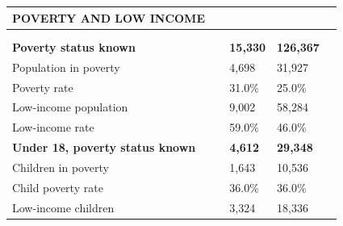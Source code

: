 \documentclass[9pt]{report}
\begin{document}
\vspace{12pt}
\setlength{\tabcolsep}{.01in} %
\begin{tabular}{p{.10in}p{.10in}p{.10in}p{3.7in}>{\hfill}p{.85in}>{\hfill}p{.85in}>{\hfill}p{.85in}>{\hfill}p{.85in}p{0.1in}}
\multicolumn{9}{l}{\parbox{7.1in}{\raggedright{\large{\strut\textbf{POVERTY AND LOW INCOME}\strut}}}} \\ 
\hline
\multicolumn{4}{l}{\parbox{3.5in}{\raggedright{\textbf{}}}} & \multicolumn{1}{r}{\parbox{.85in}{\strut\raggedleft{\textbf{}\strut}}} & \multicolumn{1}{r}{\parbox{.85in}{\strut\raggedleft{\textbf{}\strut}}} & \multicolumn{1}{r}{\parbox{.85in}{\strut{}}} & \multicolumn{1}{r}{\parbox{.85in}{\strut{}}} & \\ 
\multicolumn{9}{l}{} \\ 
\multicolumn{4}{l}{\parbox{3.5in}{\strut\raggedright{\textbf{Poverty status known}\strut}}} & \textbf{} & \textbf{} & \textbf{15,330} & \textbf{126,367} & \textbf{} \\ 
\multicolumn{4}{l}{\parbox{3.6in}{\strut\raggedright{{Population in poverty}}\strut}} &  &  & 4,698 & 31,927 & \multicolumn{1}{l}{}  \\ 
\multicolumn{4}{l}{\parbox{3.6in}{\strut\raggedright{{Poverty rate}}\strut}} &  &  & 31.0\% & 25.0\% & \multicolumn{1}{l}{}  \\ 
\multicolumn{4}{l}{\parbox{3.6in}{\strut\raggedright{{Low-income population}}\strut}} &  &  & 9,002 & 58,284 & \multicolumn{1}{l}{}  \\ 
\multicolumn{4}{l}{\parbox{3.6in}{\strut\raggedright{{Low-income rate}}\strut}} &  &  & 59.0\% & 46.0\% & \multicolumn{1}{l}{}  \\ 
\multicolumn{4}{l}{\parbox{3.5in}{\strut\raggedright{\textbf{Under 18, poverty status known}\strut}}} & \textbf{} & \textbf{} & \textbf{4,612} & \textbf{29,348} & \textbf{} \\ 
\multicolumn{4}{l}{\parbox{3.6in}{\strut\raggedright{{Children in poverty}}\strut}} &  &  & 1,643 & 10,536 & \multicolumn{1}{l}{}  \\ 
\multicolumn{4}{l}{\parbox{3.6in}{\strut\raggedright{{Child poverty rate}}\strut}} &  &  & 36.0\% & 36.0\% & \multicolumn{1}{l}{}  \\ 
\multicolumn{4}{l}{\parbox{3.6in}{\strut\raggedright{{Low-income children}}\strut}} &  &  & 3,324 & 18,336 & \multicolumn{1}{l}{}  \\ 

\end{tabular}
\end{document}
